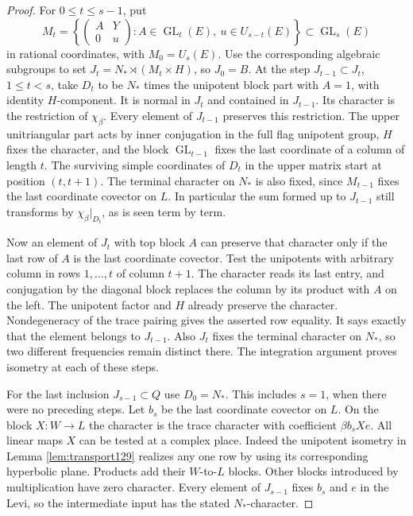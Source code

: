 \documentclass[a4paper,11pt]{article}
\theoremstyle{definition}
\theoremstyle{remark}
\numberwithin{equation}{section}
\begin{document}
\begin{proof}
For \(0\le t\le s-1\), put
\[
 M_t=\left\{\begin{pmatrix}A&Y\\0&u\end{pmatrix}
    :A\in\operatorname{GL}_t(E),\ u\in U_{s-t}(E)\right\}\subset\operatorname{GL}_s(E)
\]
in rational coordinates, with \(M_0=U_s(E)\). Use the corresponding
algebraic subgroups to set \(J_t=N_*\rtimes(M_t\times H)\), so
\(J_0=B\). At the step \(J_{t-1}\subset J_t\), \(1\le t<s\),
take \(D_t\) to be \(N_*\) times the unipotent block part with
\(A=1\), with identity \(H\)-component. It is normal in \(J_t\)
and contained in \(J_{t-1}\). Its character is the restriction of
\(\chi_\beta\). Every element of \(J_{t-1}\) preserves this
restriction. The upper unitriangular part acts by inner conjugation
in the full flag unipotent group, \(H\) fixes the character, and
the block \(\operatorname{GL}_{t-1}\) fixes the last coordinate of a column of
length \(t\). The surviving simple coordinates of \(D_t\) in the
upper matrix start at position \((t,t+1)\).
The terminal character on \(N_*\) is also fixed, since \(M_{t-1}\)
fixes the last coordinate covector on \(L\). In particular the
sum formed up to \(J_{t-1}\) still transforms by
\(\chi_\beta|_{D_t}\), as is seen term by term.

Now an element of \(J_t\) with top block \(A\) can preserve that
character only if the last row of \(A\) is the last coordinate
covector. Test the unipotents with arbitrary column in rows
\(1,\ldots,t\) of column \(t+1\). The character reads its
last entry, and conjugation by the diagonal block replaces the
column by its product with \(A\) on the left. The unipotent
factor and \(H\) already preserve the character. Nondegeneracy
of the trace pairing gives the asserted row equality. It says
exactly that the element belongs to \(J_{t-1}\).
Also \(J_t\) fixes the terminal character on \(N_*\), so two
different frequencies remain distinct there. The integration
argument proves isometry at each of these steps.

For the last inclusion \(J_{s-1}\subset Q\) use \(D_0=N_*\).
This includes \(s=1\), when there were no preceding steps.
Let \(b_s\) be the last coordinate covector on \(L\). On the
block \(X:W\to L\) the character is the trace character
with coefficient \(\beta b_s X e\).
All linear maps \(X\) can be tested at a complex place. Indeed
the unipotent isometry in Lemma \ref{lem:transport129} realizes any
one row by using its corresponding hyperbolic plane. Products
add their \(W\)-to-\(L\) blocks. Other blocks introduced by
multiplication have zero character. Every element of \(J_{s-1}\)
fixes \(b_s\) and \(e\) in the Levi, so the intermediate input
has the stated \(N_*\)-character.


\end{proof}
\end{document}
